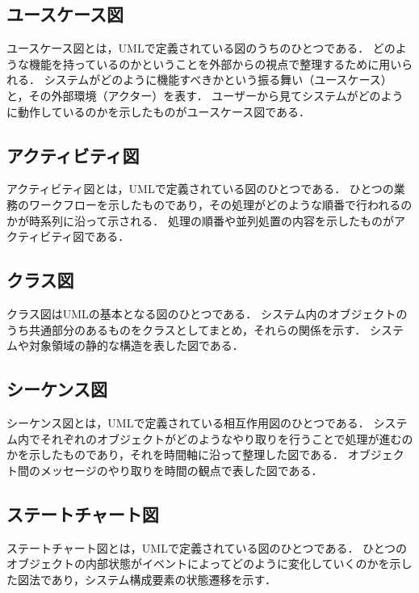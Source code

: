 \subsection*{ユースケース図}

ユースケース図とは，UMLで定義されている図のうちのひとつである．
どのような機能を持っているのかということを外部からの視点で整理するために用いられる\cite{iot}．
システムがどのように機能すべきかという振る舞い（ユースケース）と，その外部環境（アクター）を表す\cite{uml}．
ユーザーから見てシステムがどのように動作しているのかを示したものがユースケース図である．

\subsection*{アクティビティ図}

アクティビティ図とは，UMLで定義されている図のひとつである．
ひとつの業務のワークフローを示したもの\cite{uml}であり，その処理がどのような順番で行われるのかが時系列に沿って示される．
処理の順番や並列処置の内容を示したものがアクティビティ図である．

\subsection*{クラス図}

クラス図はUMLの基本となる図のひとつである．
システム内のオブジェクトのうち共通部分のあるものをクラスとしてまとめ，それらの関係を示す．
システムや対象領域の静的な構造を表した図である．

\subsection*{シーケンス図}

シーケンス図とは，UMLで定義されている相互作用図のひとつである．
システム内でそれぞれのオブジェクトがどのようなやり取りを行うことで処理が進むのかを示したものであり，それを時間軸に沿って整理した図である．
オブジェクト間のメッセージのやり取りを時間の観点で表した図である．

\subsection*{ステートチャート図}

ステートチャート図とは，UMLで定義されている図のひとつである．
ひとつのオブジェクトの内部状態がイベントによってどのように変化していくのかを示した図法\cite{uml}であり，システム構成要素の状態遷移を示す．


